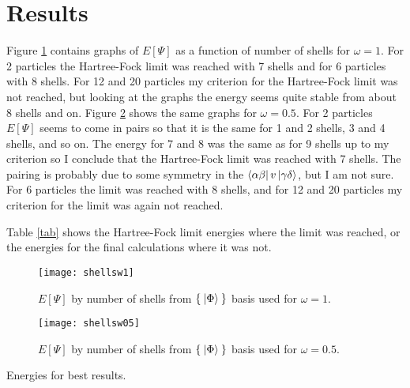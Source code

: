 \documentclass[a4paper,english,12pt]{article}
\begin{document}
\section{Results}



Figure \ref{figshellsw1} contains graphs of $E[\Psi]$ as a function of number of shells for $\omega = 1$.
For 2 particles the Hartree-Fock limit was reached with 7 shells and for 6 particles with 8 shells.
For 12 and 20 particles my criterion for the Hartree-Fock limit was not reached, but looking at the graphs the energy seems
quite stable from about 8 shells and on.
Figure \ref{figshellsw05} shows the same graphs for $\omega = 0.5$.
For 2 particles $E[\Psi]$ seems to come in pairs so that it is the same for 1 and 2 shells, 3 and 4 shells, and so on.
The energy for 7 and 8 was the same as for 9 shells up to my criterion so I conclude that the Hartree-Fock limit was reached with 7 shells.
The pairing is probably due to some symmetry in the $\bra{\alpha\beta}v\ket{\gamma\delta}$, but I am not sure.
For 6 particles the limit was reached with 8 shells, and for 12 and 20 particles my criterion for the limit was again not reached.

Table \ref{tab} shows the Hartree-Fock limit energies where the limit was reached, or the energies for the final calculations where it was not.



\begin{figure}
  \begin{center}
    \texttt{[image: shellsw1]}
  \end{center}
  \caption{$E[\Psi]$ by number of shells from \(\Set{\Ket{\Phi}}\) basis used for $\omega=1$.}\label{figshellsw1}
\end{figure}

\begin{figure}
  \begin{center}
    \texttt{[image: shellsw05]}
  \end{center}
  \caption{$E[\Psi]$ by number of shells from \(\Set{\Ket{\Phi}}\) basis used for $\omega=0.5$.}\label{figshellsw05}
\end{figure}




\begin{table}
  \caption{Energies for best results.}
  \label{tab}
  \begin{center}
    
  \end{center}
\end{table}
\end{document}
